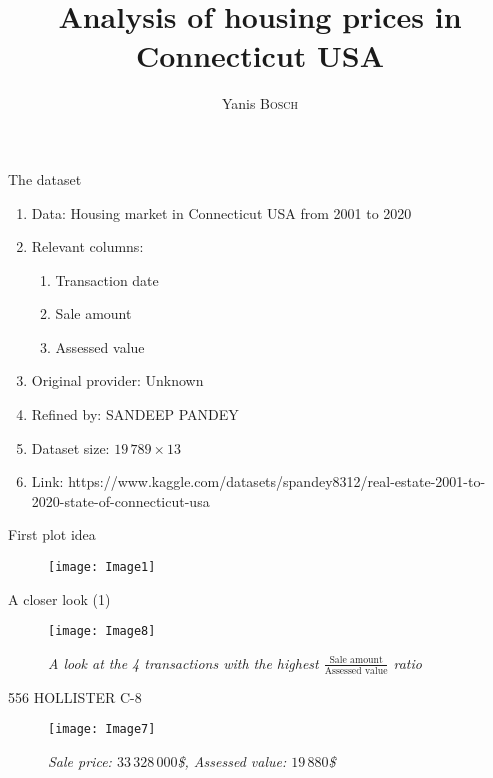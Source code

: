 \documentclass{beamer}
\begin{document}
	\begin{frame}
		\title{Analysis of housing prices in Connecticut USA}
		\author{Yanis \textsc{Bosch}}
		\maketitle
	\end{frame}

	\begin{frame}{The dataset}
		\begin{enumerate}
			\item Data: Housing market in Connecticut USA from 2001 to 2020
			\item Relevant columns: 
				\begin{enumerate}
   					\item Transaction date
    					\item Sale amount
    					\item Assessed value
				\end{enumerate}
			\item Original provider: Unknown
			\item Refined by: SANDEEP PANDEY
			\item Dataset size: $19\,789 \times 13$
			\item Link: https://www.kaggle.com/datasets/spandey8312/real-estate-2001-to-2020-state-of-connecticut-usa
		\end{enumerate}
	\end{frame}

	\begin{frame}{First plot idea}
		\begin{figure}[h]
			\centering
			\texttt{[image: Image1]}
		\end{figure}
	\end{frame}
	
	\begin{frame}{A closer look (1)}
		\begin{figure}[h]
			\centering
			\texttt{[image: Image8]}
			\caption{\textit{A look at the 4 transactions with the highest $\frac{\text{Sale amount}}{\text{Assessed value}}$ ratio}}
		\end{figure}
	\end{frame}

	\begin{frame}{556 HOLLISTER C-8}
		\begin{figure}[h]
			\centering
			\texttt{[image: Image7]}
			\caption{\textit{Sale price: $33\,328\,000$\$, Assessed value: $19\,880$\$}}
		\end{figure}
	\end{frame}
\end{document}

